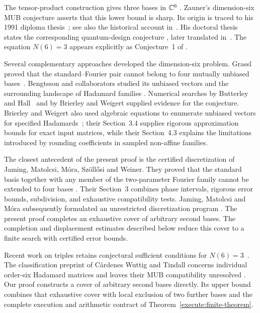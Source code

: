 The tensor-product construction gives three bases in $\mathbb C^6$
\cite[Section~4]{KlappeneckerRotteler2004}. Zauner's dimension-six MUB
conjecture asserts that this lower bound is sharp. Its origin is traced
to his 1991 diploma thesis~\cite{Zauner1991Diploma}; see also the historical
account in~\cite[Section~2.3]{McNultyWeigert2026Review}. His doctoral
thesis states the corresponding quantum-design conjecture
\cite[Section~3.3]{Zauner1999}, later translated in~\cite{Zauner2011}.
The equation $N(6)=3$ appears explicitly as Conjecture~1 of
\cite[Section~4]{KlappeneckerRotteler2004}.

Several complementary approaches developed the dimension-six problem.
Grassl proved that the standard--Fourier pair cannot belong to four
mutually unbiased bases~\cite[Theorem~2]{Grassl2004SICMUB6}.
Bengtsson and collaborators studied its
unbiased vectors and the surrounding landscape of Hadamard families
\cite{BengtssonEtAl2007MUBHadamard}. Numerical searches by Butterley and
Hall~\cite{ButterleyHall2007Numerical} and by Brierley and Weigert
\cite{BrierleyWeigert2008} supplied evidence for the conjecture.
Brierley and Weigert also used algebraic equations to enumerate unbiased
vectors for specified Hadamards~\cite{BrierleyWeigert2009}; their
Section~3.4 supplies rigorous approximation bounds for exact input
matrices, while their Section~4.3 explains the limitations introduced by
rounding coefficients in sampled non-affine families.

The closest antecedent of the present proof is the certified
discretization of Jaming, Matolcsi, M\'ora, Sz{\"o}ll{\H o}si and Weiner.
They proved that the standard basis together with any member of the
two-parameter Fourier family cannot be extended to four bases
\cite[Theorem~1.4]{JamingEtAl2009}. Their Section~3 combines phase
intervals, rigorous error bounds, subdivision, and exhaustive
compatibility tests. Jaming, Matolcsi and M\'ora subsequently formulated
an unrestricted discretization program
\cite[Sections~2--4]{JamingMatolcsiMora2010}. The present proof completes
an exhaustive cover of arbitrary second bases. The completion and
displacement estimates described below reduce this cover to a finite
search with certified error bounds.

Recent work on triples retains conjectural sufficient conditions for
$N(6)=3$~\cite[Section~4]{MatolcsiEtAl2026}. The classification preprint
of C\'ardenes Wuttig and Tindall concerns individual order-six Hadamard
matrices and leaves their MUB compatibility unresolved
\cite[Section~VI]{CardenesWuttigTindall2026Classification}. Our proof
constructs a cover of arbitrary second bases directly. Its upper bound
combines that exhaustive cover with local exclusion of two further bases
and the complete execution and arithmetic contract of
Theorem~\ref{execute:finite-theorem}.


